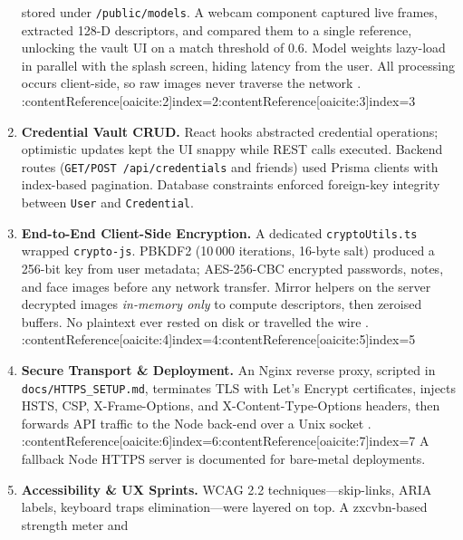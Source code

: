 \begin{enumerate}[leftmargin=*,label=\textbf{Phase \arabic*}]
      stored under \texttt{/public/models}.  A webcam component captured live
      frames, extracted 128-D descriptors, and compared them to a single
      reference, unlocking the vault UI on a match threshold of 0.6.  Model
      weights lazy-load in parallel with the splash screen, hiding latency
      from the user.  All processing occurs client-side, so raw images never
      traverse the network \autocite{SECURITYGuide}. :contentReference[oaicite:2]{index=2}:contentReference[oaicite:3]{index=3}
\item \textbf{Credential Vault CRUD.}  
      React hooks abstracted credential operations; optimistic updates kept
      the UI snappy while REST calls executed.  Backend routes
      (\texttt{GET/POST /api/credentials} and friends) used Prisma clients
      with index-based pagination.  Database constraints enforced foreign-key
      integrity between \texttt{User} and \texttt{Credential}.
\item \textbf{End-to-End Client-Side Encryption.}  
      A dedicated \texttt{cryptoUtils.ts} wrapped \texttt{crypto-js}.  PBKDF2
      (10 000 iterations, 16-byte salt) produced a 256-bit key from user
      metadata; AES-256-CBC encrypted passwords, notes, and face images
      before any network transfer.  Mirror helpers on the server decrypted
      images \emph{in-memory only} to compute descriptors, then zeroised
      buffers.  No plaintext ever rested on disk or travelled the wire
      \autocite{SECURITYGuide}. :contentReference[oaicite:4]{index=4}:contentReference[oaicite:5]{index=5}
\item \textbf{Secure Transport \& Deployment.}  
      An Nginx reverse proxy, scripted in \texttt{docs/HTTPS\_SETUP.md},
      terminates TLS with Let's Encrypt certificates, injects HSTS, CSP,
      X-Frame-Options, and X-Content-Type-Options headers, then forwards API
      traffic to the Node back-end over a Unix socket \autocite{HTTPSGuide}. :contentReference[oaicite:6]{index=6}:contentReference[oaicite:7]{index=7}  
      A fallback Node HTTPS server is documented for bare-metal deployments.
\item \textbf{Accessibility \& UX Sprints.}  
      WCAG 2.2 techniques—skip-links, ARIA labels, keyboard traps
      elimination—were layered on top.  A zxcvbn-based strength meter and

\end{enumerate}
